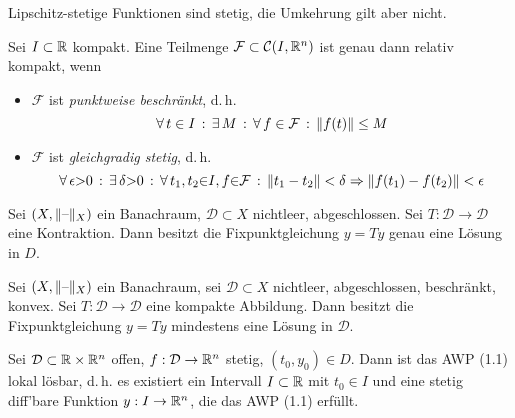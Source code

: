 \documentclass{cheat-sheet}
\newcommand{\D}{\mathcal{D}}
\begin{document}
\begin{bem}
  Lipschitz-stetige Funktionen sind stetig, die Umkehrung gilt aber nicht.
\end{bem}


\begin{satz}
  Sei $I \subset \mathbb{R}$ kompakt. Eine Teilmenge $\mathcal{F} \subset \mathcal{C}(I, \mathbb{R}^n)$ ist genau dann relativ kompakt, wenn
  \begin{itemize}
    \item $\mathcal{F}$ ist \emph{punktweise beschränkt}, d.\,h.
    \[ \forall \, {t \in I} \,:\, \exists \, {M} \,:\, \forall \, {f \in \mathcal{F}} \,:\, \lVert f(t)\rVert \leq M \]
    \item $\mathcal{F}$ ist \emph{gleichgradig stetig}, d.\,h.
    \[ \forall \, {\epsilon {>} 0} \,:\, \exists \, {\delta {>} 0} \,:\, \forall \, {t_1, t_2 {\in} I, f {\in} \mathcal{F}} \,:\, \lVert t_1 - t_2\rVert < \delta \Rightarrow \lVert f(t_1) - f(t_2)\rVert < \epsilon \]
  \end{itemize}
\end{satz}

\begin{satz}
  Sei $(X, \lVert\text{--}\rVert_X)$ ein Banachraum, $\D \subset X$ nichtleer, abgeschlossen. Sei $T : \D \to \D$ eine Kontraktion. Dann besitzt die Fixpunktgleichung $y = Ty$ genau eine Lösung in $D$.
\end{satz}

\begin{satz}
  Sei $(X, \lVert\text{--}\rVert_X)$ ein Banachraum, sei $\D \subset X$ nichtleer, abgeschlossen, beschränkt, konvex. Sei $T : \D \to \D$ eine kompakte Abbildung. Dann besitzt die Fixpunktgleichung $y = Ty$ mindestens eine Lösung in $\D$.
\end{satz}


\begin{satz}[Peano]
  Sei $\D \subset \R \times \R^n$ offen, $f : \D \to \R^n$ stetig, $(t_0, y_0) \in D$. Dann ist das AWP (1.1) lokal lösbar, d.\,h. es existiert ein Intervall $I \subset \mathbb{R}$ mit $t_0 \in I$ und eine stetig diff'bare Funktion $y : I \to \mathbb{R}^n$, die das AWP (1.1) erfüllt.
\end{satz}


\end{document}
